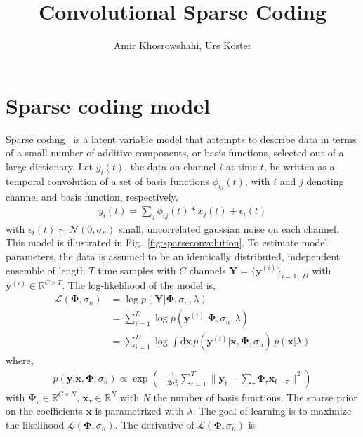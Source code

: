 \documentclass[10pt]{article}
\author{Amir Khosrowshahi, Urs K\"oster}
\title{Convolutional Sparse Coding}
\newcommand{\mb}{\mathbf}
\newcommand{\norm}[1]{\lVert#1\rVert}
\begin{document}
\maketitle

\section{Sparse coding model}
\label{sec:sparsealg}

Sparse coding~\cite{Olshausen96,olshausen2003learning,Smith:2006qf} is
a latent variable model that attempts to describe data in terms of a
small number of additive components, or basis functions, selected out
of a large dictionary. Let $y_i(t)$, the data on channel $i$ at time
$t$, be written as a temporal convolution of a set of basis functions
$\phi_{ij}(t)$, with $i$ and $j$ denoting channel and basis function,
respectively,
\begin{align}
y_i(t) = \sum_j \phi_{ij}(t) * x_j(t) + \epsilon_{i}(t) \label{eqn:conv}
\end{align}
with $\epsilon_i(t) \sim \mathcal{N}(0,\sigma_n)$ small, uncorrelated
gaussian noise on each channel. This model is illustrated in
Fig.~\ref{fig:sparseconvolution}. To estimate model parameters, the
data is assumed to be an identically distributed, independent ensemble
of length $T$ time samples with $C$ channels $\mb{Y} =
\{\mb{y}^{(i)}\}_{i=1\ldots D}$ with $\mb{y}^{(i)} \in \mathbb{R}^{C
  \times T}$. The log-likelihood of the model is,
\begin{align*}
\mathcal{L}(\mb{\Phi}, \sigma_n)
&= \log p(\mb{Y} | \mb{\Phi}, \sigma_n, \lambda) \\
&= \sum_{i=1}^D \log p(\mb{y}^{(i)} | \mb{\Phi}, \sigma_n, \lambda) \\
&= \sum_{i=1}^D \log \int \mathrm{d} \mb{x} \, p(\mb{y}^{(i)}
| \mb{x}, \mb{\Phi}, \sigma_n) \, p(\mb{x} | \lambda)
\end{align*}
where,
\begin{align*}
  p(\mb{y} | \mb{x}, \mb{\Phi}, \sigma_n) \propto
  \exp\left(-\frac{1}{2 \sigma_n^2} \sum_{t=1}^T \norm{\mb{y}_t -
      \sum_\tau \mb{\Phi}_\tau \mb{x}_{t-\tau}}^2\right)
\end{align*}
with $\mb{\Phi}_\tau \in \mathbb{R}^{C \times N}$, $\mb{x}_\tau \in
\mathbb{R}^N$ with $N$ the number of basis functions. The sparse prior
on the coefficients $\mb{x}$ is parametrized with $\lambda$. The goal
of learning is to maximize the likelihood $\mathcal{L}(\mb{\Phi},
\sigma_n)$. The derivative of $\mathcal{L}(\mb{\Phi}, \sigma_n)$ is
\end{document}
